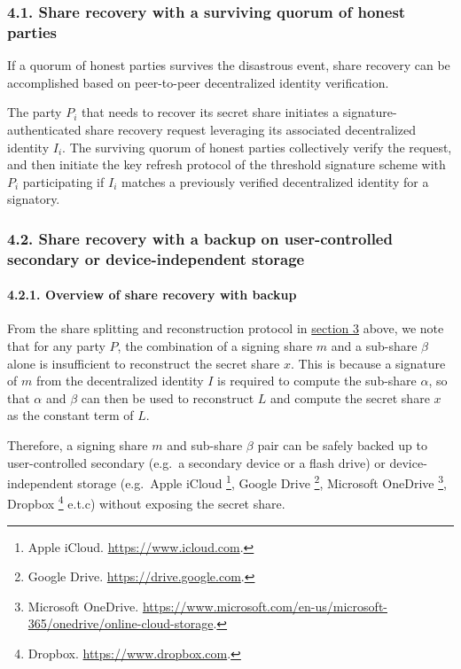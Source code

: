\documentclass[
]{article}
\begin{document}
\hypertarget{share-recovery-quorum}{%
\subsubsection{4.1. Share recovery with a surviving quorum of honest
parties}\label{share-recovery-quorum}}

If a quorum of honest parties survives the disastrous event, share
recovery can be accomplished based on peer-to-peer decentralized
identity verification.

The party \(P_i\) that needs to recover its secret share initiates a
signature-authenticated share recovery request leveraging its associated
decentralized identity \(I_i\). The surviving quorum of honest parties
collectively verify the request, and then initiate the key refresh
protocol of the threshold signature scheme with \(P_i\) participating if
\(I_i\) matches a previously verified decentralized identity for a
signatory.

\hypertarget{share-recovery-backup}{%
\subsubsection{4.2. Share recovery with a backup on user-controlled
secondary or device-independent storage}\label{share-recovery-backup}}

\hypertarget{share-recovery-backup-overview}{%
\paragraph{4.2.1. Overview of share recovery with
backup}\label{share-recovery-backup-overview}}

From the share splitting and reconstruction protocol in
\protect\hyperlink{share-splitting-and-reconstruction}{section 3} above,
we note that for any party \(P\), the combination of a signing share
\(m\) and a sub-share \(\beta\) alone is insufficient to reconstruct the
secret share \(x\). This is because a signature of \(m\) from the
decentralized identity \(I\) is required to compute the sub-share
\(\alpha\), so that \(\alpha\) and \(\beta\) can then be used to
reconstruct \(L\) and compute the secret share \(x\) as the constant
term of \(L\).

Therefore, a signing share \(m\) and sub-share \(\beta\) pair can be
safely backed up to user-controlled secondary (e.g.~a secondary device
or a flash drive) or device-independent storage (e.g.~Apple iCloud
\footnote{Apple iCloud. \url{https://www.icloud.com}.}, Google Drive
\footnote{Google Drive. \url{https://drive.google.com}.}, Microsoft
OneDrive \footnote{Microsoft OneDrive.
  \url{https://www.microsoft.com/en-us/microsoft-365/onedrive/online-cloud-storage}.},
Dropbox \footnote{Dropbox. \url{https://www.dropbox.com}.} e.t.c)
without exposing the secret share.
\end{document}
